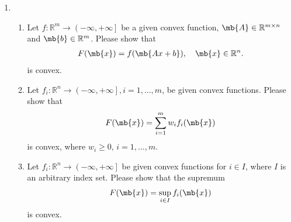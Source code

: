 \begin{exercise}
  \begin{enumerate}

    \item
      \begin{enumerate}
        \item Let $f:\mathbb{R}^m \rightarrow \left( -\infty,+\infty \right]$ be a given convex function, $\mb{A}\in \mathbb{R}^{m \times n}$ and $\mb{b} \in \mathbb{R}^m$. Please show that
          \begin{align*}
            F(\mb{x}) = f(\mb{Ax+b}),\quad\mb{x}\in\mathbb{R}^n.
          \end{align*}
          is convex.
        \item Let $f_i:\mathbb{R}^n \rightarrow \left(-\infty,+\infty \right],i=1,\dots,m$, be given convex functions. Please show that
          \begin{align*}
            F(\mb{x}) = \sum_{i=1}^m w_if_i(\mb{x})
          \end{align*}
          is convex, where $w_i \geq 0,\,i=1,\dots,m$.
          
        \item
          Let $f_i:\mathbb{R}^n \rightarrow \left(-\infty,+\infty \right]$ be given convex functions for $i \in I$, where $I$ is an arbitrary index set. Please show that the supremum
          \begin{align*}
            F(\mb{x}) = \sup_{i\in I}f_i(\mb{x})
          \end{align*}
          is convex.
          
      \end{enumerate}
      

\end{enumerate}
\end{exercise}
